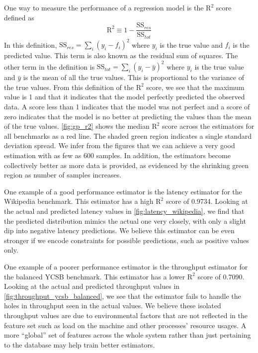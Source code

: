 One way to measure the performance of a regression model is the
$\textrm{R}^2$ score defined as
\begin{equation*}
  \textrm{R}^2 \equiv 1 - \frac{\textrm{SS}_{res}}{\textrm{SS}_{tot}}
\end{equation*}
In this definition, $\textrm{SS}_{res} = \sum_i (y_i - f_i)^2$ where
$y_i$ is the true value and $f_i$ is the predicted value. This term is
also known as the residual sum of squares. The other term in the
definition is $\textrm{SS}_{tot} = \sum_i (y_i - \bar{y})^2$ where
$y_i$ is the true value and $\bar{y}$ is the mean of all the true
values. This is proportional to the variance of the true values. From
this definition of the $\textrm{R}^2$ score, we see that the maximum
value is 1 and that it indicates that the model perfectly predicted
the observed data. A score less than 1 indicates that the model was
not perfect and a score of zero indicates that the model is no better
at predicting the values than the mean of the true
values. \cref{fig:gp_r2} shows
the median $\textrm{R}^2$ score across the estimators for all
benchmarks as a red line. The shaded green region indicates a single
standard deviation spread. We infer from the figures that we can
achieve a very good estimation with as few as 600 samples. In
addition, the estimators become collectively better as more data is
provided, as evidenced by the shrinking green region as number of
samples increases.

One example of a good performance estimator is the latency estimator
for the Wikipedia benchmark. This estimator has a high $\textrm{R}^2$
score of 0.9734. Looking at the actual and predicted latency values in
\cref{fig:latency_wikipedia}, we find that the
predicted distribution mimics the actual one very closely, with only a
slight dip into negative latency predictions. We believe this
estimator can be even stronger if we encode constraints for possible
predictions, such as positive values only.

One example of a poorer performance estimator is the throughput
estimator for the balanced YCSB benchmark. This estimator has a lower
$\textrm{R}^2$ score of 0.7090. Looking at the actual and predicted
throughput values in \cref{fig:throughput_ycsb_balanced}, we see that
the estimator fails to handle the holes in throughput seen in the
actual values. We believe these isolated throughput values are due to
environmental factors that are not reflected in the feature set such
as load on the machine and other processes' resource usages. A more
``global'' set of features across the whole system rather than just
pertaining to the database may help train better estimators.


